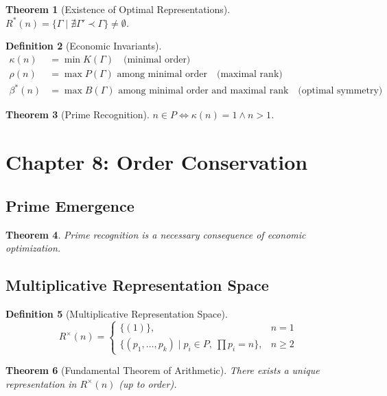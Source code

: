 \documentclass[12pt]{article}
\newtheorem{theorem}{Theorem}[section]
\theoremstyle{definition}
\newtheorem{definition}[theorem]{Definition}
\begin{document}
\begin{theorem}[Existence of Optimal Representations]
\(R^*(n) = \{\Gamma \mid \nexists \Gamma' \prec \Gamma\} \neq \emptyset\).
\end{theorem}

\begin{definition}[Economic Invariants]
\begin{align*}
\kappa(n) &= \min K(\Gamma) \quad \text{(minimal order)} \\
\rho(n) &= \max P(\Gamma) \text{ among minimal order} \quad \text{(maximal rank)} \\
\beta^*(n) &= \max B(\Gamma) \text{ among minimal order and maximal rank} \quad \text{(optimal symmetry)}
\end{align*}
\end{definition}

\begin{theorem}[Prime Recognition]
\(n \in P \iff \kappa(n) = 1 \land n > 1\).
\end{theorem}

\section{Chapter 8: Order Conservation}

\subsection{Prime Emergence}

\begin{theorem}
Prime recognition is a necessary consequence of economic optimization.
\end{theorem}

\subsection{Multiplicative Representation Space}

\begin{definition}[Multiplicative Representation Space]
\[
R^{\times}(n) =
\begin{cases}
\{(1)\}, & n = 1 \\
\{(p_1,\dots,p_k) \mid p_i \in P,\ \prod p_i = n\}, & n \geq 2
\end{cases}
\]
\end{definition}

\begin{theorem}[Fundamental Theorem of Arithmetic]
There exists a unique representation in \(R^{\times}(n)\) (up to order).
\end{theorem}
\end{document}
